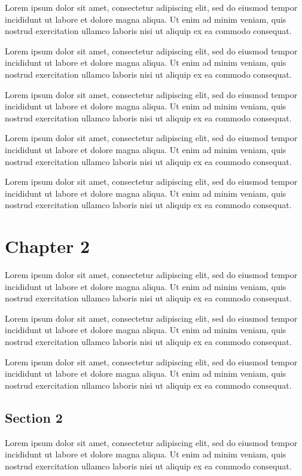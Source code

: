 \documentclass{book}
\begin{document}
Lorem ipsum dolor sit amet, consectetur adipiscing elit, sed do eiusmod tempor incididunt ut labore et dolore magna aliqua. Ut enim ad minim veniam, quis nostrud exercitation ullamco laboris nisi ut aliquip ex ea commodo consequat.

Lorem ipsum dolor sit amet, consectetur adipiscing elit, sed do eiusmod tempor incididunt ut labore et dolore magna aliqua. Ut enim ad minim veniam, quis nostrud exercitation ullamco laboris nisi ut aliquip ex ea commodo consequat.

Lorem ipsum dolor sit amet, consectetur adipiscing elit, sed do eiusmod tempor incididunt ut labore et dolore magna aliqua. Ut enim ad minim veniam, quis nostrud exercitation ullamco laboris nisi ut aliquip ex ea commodo consequat.

Lorem ipsum dolor sit amet, consectetur adipiscing elit, sed do eiusmod tempor incididunt ut labore et dolore magna aliqua. Ut enim ad minim veniam, quis nostrud exercitation ullamco laboris nisi ut aliquip ex ea commodo consequat.

Lorem ipsum dolor sit amet, consectetur adipiscing elit, sed do eiusmod tempor incididunt ut labore et dolore magna aliqua. Ut enim ad minim veniam, quis nostrud exercitation ullamco laboris nisi ut aliquip ex ea commodo consequat.

\chapter{Chapter 2}
Lorem ipsum dolor sit amet, consectetur adipiscing elit, sed do eiusmod tempor incididunt ut labore et dolore magna aliqua. Ut enim ad minim veniam, quis nostrud exercitation ullamco laboris nisi ut aliquip ex ea commodo consequat.

Lorem ipsum dolor sit amet, consectetur adipiscing elit, sed do eiusmod tempor incididunt ut labore et dolore magna aliqua. Ut enim ad minim veniam, quis nostrud exercitation ullamco laboris nisi ut aliquip ex ea commodo consequat.

Lorem ipsum dolor sit amet, consectetur adipiscing elit, sed do eiusmod tempor incididunt ut labore et dolore magna aliqua. Ut enim ad minim veniam, quis nostrud exercitation ullamco laboris nisi ut aliquip ex ea commodo consequat.

\section{Section 2}
Lorem ipsum dolor sit amet, consectetur adipiscing elit, sed do eiusmod tempor incididunt ut labore et dolore magna aliqua. Ut enim ad minim veniam, quis nostrud exercitation ullamco laboris nisi ut aliquip ex ea commodo consequat.
\end{document}
